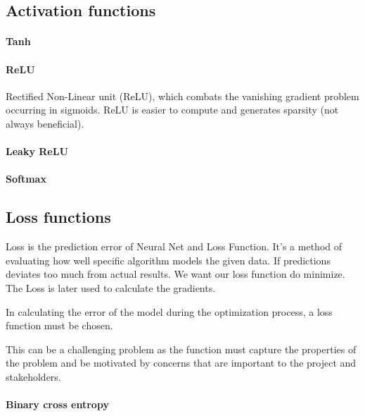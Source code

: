 \subsection{Activation functions}	
%
%

\paragraph{Tanh}

\paragraph{ReLU}

Rectified Non-Linear unit (ReLU), which combats the vanishing gradient problem occurring in sigmoids. ReLU is easier to compute and generates sparsity (not always beneficial).

\paragraph{Leaky ReLU}

\paragraph{Softmax}

%
%
\subsection{Loss functions}	
%
Loss is the prediction error of Neural Net and Loss Function. It's a method of evaluating how well specific algorithm models the given data. If predictions deviates too much from actual results. We want our loss function do minimize. The Loss is later used to calculate the gradients. 

In calculating the error of the model during the optimization process, a loss function must be chosen.

This can be a challenging problem as the function must capture the properties of the problem and be motivated by concerns that are important to the project and stakeholders.

%
\paragraph{Binary cross entropy}

